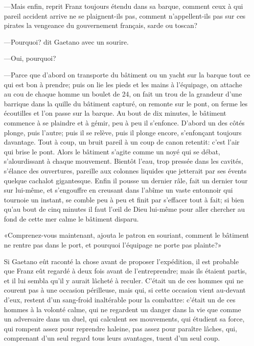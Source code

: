 —Mais enfin, reprit Franz toujours étendu dans sa barque, comment ceux à qui pareil accident arrive ne se plaignent-ils pas, comment n'appellent-ils pas sur ces pirates la vengeance du gouvernement français, sarde ou toscan?

—Pourquoi? dit Gaetano avec un sourire.

—Oui, pourquoi?

—Parce que d'abord on transporte du bâtiment ou un yacht sur la barque tout ce qui est bon à prendre; puis on lie les pieds et les mains à l'équipage, on attache au cou de chaque homme un boulet de 24, on fait un trou de la grandeur d'une barrique dans la quille du bâtiment capturé, on remonte sur le pont, on ferme les écoutilles et l'on passe sur la barque. Au bout de dix minutes, le bâtiment commence à se plaindre et à gémir, peu à peu il s'enfonce. D'abord un des côtés plonge, puis l'autre; puis il se relève, puis il plonge encore, s'enfonçant toujours davantage. Tout à coup, un bruit pareil à un coup de canon retentit: c'est l'air qui brise le pont. Alors le bâtiment s'agite comme un noyé qui se débat, s'alourdissant à chaque mouvement. Bientôt l'eau, trop pressée dans les cavités, s'élance des ouvertures, pareille aux colonnes liquides que jetterait par ses évents quelque cachalot gigantesque. Enfin il pousse un dernier râle, fait un dernier tour sur lui-même, et s'engouffre en creusant dans l'abîme un vaste entonnoir qui tournoie un instant, se comble peu à peu et finit par s'effacer tout à fait; si bien qu'au bout de cinq minutes il faut l'œil de Dieu lui-même pour aller chercher au fond de cette mer calme le bâtiment disparu.

«Comprenez-vous maintenant, ajouta le patron en souriant, comment le bâtiment ne rentre pas dans le port, et pourquoi l'équipage ne porte pas plainte?»

Si Gaetano eût raconté la chose avant de proposer l'expédition, il est probable que Franz eût regardé à deux fois avant de l'entreprendre; mais ils étaient partis, et il lui sembla qu'il y aurait lâcheté à reculer. C'était un de ces hommes qui ne courent pas à une occasion périlleuse, mais qui, si cette occasion vient au-devant d'eux, restent d'un sang-froid inaltérable pour la combattre: c'était un de ces hommes à la volonté calme, qui ne regardent un danger dans la vie que comme un adversaire dans un duel, qui calculent ses mouvements, qui étudient sa force, qui rompent assez pour reprendre haleine, pas assez pour paraître lâches, qui, comprenant d'un seul regard tous leurs avantages, tuent d'un seul coup.

